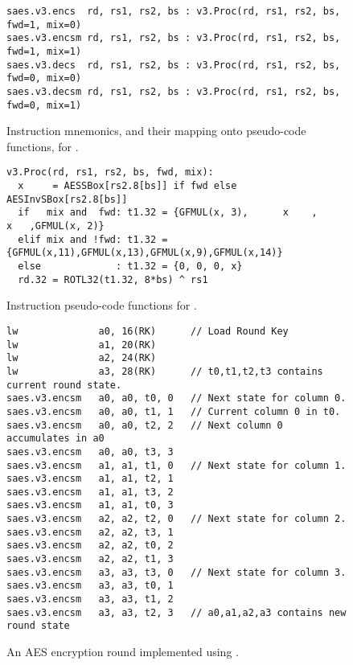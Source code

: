 
\vspace*{\fill}

\begin{figure}[!h]
\begin{lstlisting}[language=pseudo,style=block]
saes.v3.encs  rd, rs1, rs2, bs : v3.Proc(rd, rs1, rs2, bs, fwd=1, mix=0)
saes.v3.encsm rd, rs1, rs2, bs : v3.Proc(rd, rs1, rs2, bs, fwd=1, mix=1)
saes.v3.decs  rd, rs1, rs2, bs : v3.Proc(rd, rs1, rs2, bs, fwd=0, mix=0)
saes.v3.decsm rd, rs1, rs2, bs : v3.Proc(rd, rs1, rs2, bs, fwd=0, mix=1)
\end{lstlisting}
\caption{
  Instruction mnemonics, and their mapping onto pseudo-code functions, for .
}
\label{fig:v3:mnemonics}
\end{figure}

\begin{figure}[!h]
\begin{lstlisting}[language=pseudo,style=block]
v3.Proc(rd, rs1, rs2, bs, fwd, mix):
  x     = AESSBox[rs2.8[bs]] if fwd else AESInvSBox[rs2.8[bs]]
  if   mix and  fwd: t1.32 = {GFMUL(x, 3),      x    ,      x   ,GFMUL(x, 2)}
  elif mix and !fwd: t1.32 = {GFMUL(x,11),GFMUL(x,13),GFMUL(x,9),GFMUL(x,14)}
  else             : t1.32 = {0, 0, 0, x}
  rd.32 = ROTL32(t1.32, 8*bs) ^ rs1
\end{lstlisting}
\caption{
  Instruction pseudo-code functions for .
}
\label{fig:v3:pseudo}
\end{figure}

\begin{figure}[!h]
\begin{lstlisting}[language=pseudo,style=block]
lw              a0, 16(RK)      // Load Round Key
lw              a1, 20(RK)
lw              a2, 24(RK)
lw              a3, 28(RK)      // t0,t1,t2,t3 contains current round state.
saes.v3.encsm   a0, a0, t0, 0   // Next state for column 0.
saes.v3.encsm   a0, a0, t1, 1   // Current column 0 in t0.
saes.v3.encsm   a0, a0, t2, 2   // Next column 0 accumulates in a0
saes.v3.encsm   a0, a0, t3, 3
saes.v3.encsm   a1, a1, t1, 0   // Next state for column 1.
saes.v3.encsm   a1, a1, t2, 1
saes.v3.encsm   a1, a1, t3, 2
saes.v3.encsm   a1, a1, t0, 3
saes.v3.encsm   a2, a2, t2, 0   // Next state for column 2.
saes.v3.encsm   a2, a2, t3, 1
saes.v3.encsm   a2, a2, t0, 2
saes.v3.encsm   a2, a2, t1, 3
saes.v3.encsm   a3, a3, t3, 0   // Next state for column 3.
saes.v3.encsm   a3, a3, t0, 1
saes.v3.encsm   a3, a3, t1, 2
saes.v3.encsm   a3, a3, t2, 3   // a0,a1,a2,a3 contains new round state
\end{lstlisting}
\caption{
  An AES encryption round implemented using .
}
\label{fig:v3:round}
\end{figure}

\vspace*{\fill}

